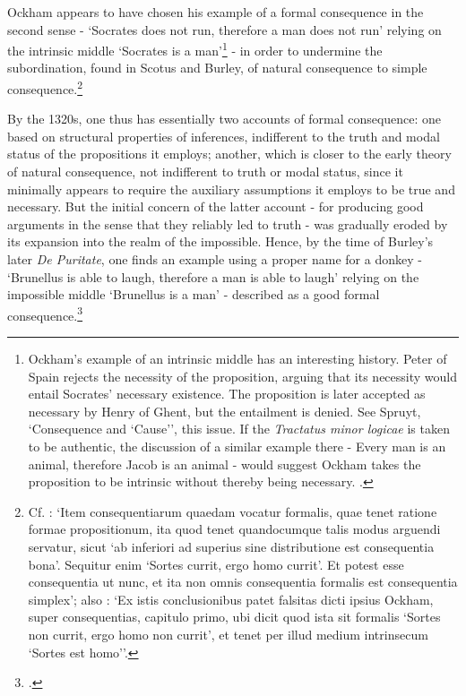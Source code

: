 \documentclass[]{article}
\begin{document}
Ockham appears to have chosen his example of a formal consequence in the second sense - `Socrates does not run, therefore a man does not run' relying on the intrinsic middle `Socrates is a man'\footnote{Ockham's example of an intrinsic middle has an interesting history. Peter of Spain rejects the necessity of the proposition, arguing that its necessity would entail Socrates' necessary existence. The proposition is later accepted as necessary by Henry of Ghent, but the entailment is denied. See Spruyt, `Consequence and `Cause'', this issue. If the \textit{Tractatus minor logicae} is taken to be authentic, the discussion of a similar example there - Every man is an animal, therefore Jacob is an animal - would suggest Ockham takes the proposition to be intrinsic without thereby being necessary. \autocite[V, c. 1, p. 31.10-15]{OckhamTML}.} - in order to undermine the subordination, found in Scotus and Burley, of natural consequence to simple consequence.\footnote{Cf. \autocite[VI, c. 4, p. 163.3-8]{OckhamEL}: `Item consequentiarum quaedam vocatur formalis, quae tenet ratione formae propositionum, ita quod tenet quandocumque talis modus arguendi servatur, sicut `ab inferiori ad superius sine distributione est consequentia bona'. Sequitur enim `Sortes currit, ergo homo currit'. Et potest esse consequentia ut nunc, et ita non omnis consequentia formalis est consequentia simplex'; also \autocite[A.III, par. 16, p. 95]{Green-Pedersen1982}: `Ex istis conclusionibus patet falsitas dicti ipsius Ockham, super consequentias, capitulo primo, ubi dicit quod ista sit formalis `Sortes non currit, ergo homo non currit', et tenet per illud medium intrinsecum `Sortes est homo''.}

By the 1320s, one thus has essentially two accounts of formal consequence: one based on structural properties of inferences, indifferent to the truth and modal status of the propositions it employs; another, which is closer to the early theory of natural consequence, not indifferent to truth or modal status, since it minimally appears to require the auxiliary assumptions it employs to be true and necessary. But the initial concern of the latter account - for producing good arguments in the sense that they reliably led to truth - was gradually eroded by its expansion into the realm of the impossible. Hence, by the time of Burley's later \textit{De Puritate}, one finds an example using a proper name for a donkey - `Brunellus is able to laugh, therefore a man is able to laugh'  relying on the impossible middle `Brunellus is a man' - described as a good formal consequence.\footnote{\autocite[p. 86.4-21]{BurleyDPAL}.}
\end{document}
